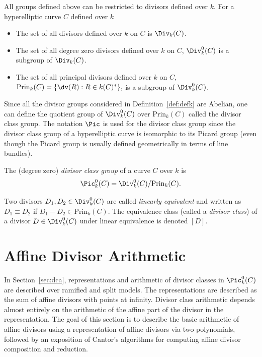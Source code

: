 \bd\label{def:defk}
All groups defined above can be restricted to divisors defined over $k$. For a
hyperelliptic curve $C$ defined over $k$ \begin{itemize}
  \item The set of all divisors defined over $k$ on $C$ is $\Div_k(C)$.
  \item The set of all degree zero divisors defined over $k$ on $C$,
  $\Div^0_k(C)$ is a subgroup of $\Div_k(C)$.
  \item The set of all principal divisors defined over $k$ on $C$,
  $\mathrm{Prin}_k(C) = \{\dv(R) : R \in k(C)^* \},$ is a subgroup of
  $\Div^0_k(C)$.
\end{itemize}
\ed



Since all the divisor groups considered in Definition~\ref{def:defk} are
Abelian, one can define the quotient group of $\Div^0_{k}(C)$ over $
\mathrm{Prin}_{k}(C)$ called the divisor class group. The notation $\Pic$ is
used for the divisor class group since the divisor class group of a
hyperelliptic curve is isomorphic to its Picard group (even though the Picard
group is usually defined geometrically in terms of line bundles).

\bd\label{def:equiv}
\cite[Adapted from Definition~7.8.1]{Galbraith_PKC_2012} The (degree zero)
\emph{divisor class group} of a curve $C$ over $k$ is $$\Pic^0_{k}(C) =
\Div^0_{k}(C) / \mathrm{Prin}_{k}(C).$$

Two divisors $D_1,D_2 \in \Div^0_k(C)$ are called \emph{linearly equivalent} and
written as $D_1 \equiv D_2$ if $D_1 - D_2 \in \mathrm{Prin}_{k}(C)$. The
equivalence class (called a \emph{divisor class}) of a divisor $D \in
\Div^0_{k}(C)$ under linear equivalence is denoted $[D]$.
\ed

\section{Affine Divisor Arithmetic}
In Section~\ref{sec:dca}, representations and arithmetic of divisor classes in
$\Pic^0_k(C)$ are described over ramified and split models. The
representations are described as the sum of affine divisors with
points at infinity. Divisor class arithmetic depends almost entirely on the
arithmetic of the affine part of the divisor in the representation. The goal of
this section is to describe the basic arithmetic of affine divisors using a
representation of affine divisors via two polynomials, followed by an exposition
of Cantor's algorithms for computing affine divisor composition and reduction.

